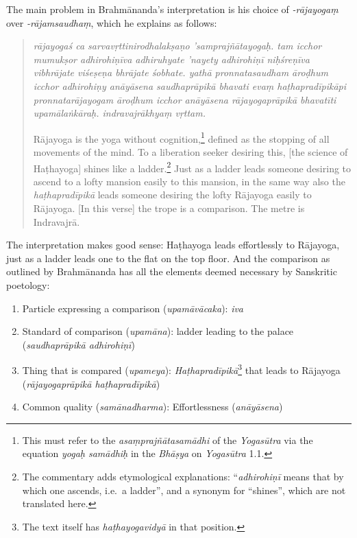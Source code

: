 \begin{ekdosis}
\begin{philcomm}[hp01_001]
The main problem in Brahmānanda's interpretation is his choice of \emph{-rājayogaṃ} over
\emph{-rājamsaudhaṃ}, which he explains as follows:

\begin{quote}
  \emph{rājayogaś ca sarvavṛttini\-rodhalakṣaṇo 'samprajñātayogaḥ. tam icchor mumukṣor adhirohiṇīva
  adhi\-ruhyate 'nayety adhirohiṇī niḥśreṇīva vibhrājate viśeṣeṇa bhrājate śobhate. yathā
  pronnatasaudham āroḍhum icchor adhirohiṇy anāyāsena saudha\-prāpi\-kā bhavati evaṃ
  haṭhapradīpikāpi pronnatarājayogam āroḍhum icchor anā\-yāsena rājayogaprāpikā bhavatīti
  upamālaṅkāraḥ.  indravajrākhyaṃ vṛttam.}

Rājayoga is the yoga without cognition,\footnote{This must refer to the \emph{asaṃprajñātasamādhi}
  of the \emph{Yogasūtra} via the equation \emph{yogaḥ samādhiḥ} in the \emph{Bhāṣya} on \emph{Yogasūtra}  1.1.} defined as the stopping of all movements of the mind. To a liberation seeker desiring this, [the science of Haṭhayoga] shines like a ladder.\footnote{The commentary adds etymological explanations: ``\emph{adhirohiṇī} means that by which one ascends, i.e.\ a ladder'', and a synonym for ``shines'', which are not translated here.} Just as a ladder leads someone desiring to ascend to a lofty mansion easily to this mansion, in the same way also the
\emph{haṭhapradīpikā} leads someone desiring the lofty Rājayoga easily to Rājayoga. [In this verse]
the trope is a comparison. The metre is Indravajrā.
\end{quote}

The interpretation makes good sense: Haṭhayoga leads effortlessly to Rājayoga, just as a ladder
leads one to the flat on the top floor. And the comparison as outlined by Brahmānanda has all the
elements deemed necessary by Sanskritic poetology:

\begin{enumerate}
\item Particle expressing a comparison (\emph{upamāvācaka}): \emph{iva} 
\item Standard of comparison (\emph{upamāna}): ladder leading to the palace (\emph{saudhaprāpikā
    adhirohiṇī}) 
\item Thing that is compared (\emph{upameya}): \emph{Haṭhapradīpikā}\footnote{The text itself has
    \emph{haṭhayogavidyā} in that position.} that leads to Rājayoga (\emph{rājayogaprāpikā
    haṭhapradīpikā}) 
\item Common quality  (\emph{samānadharma}): Effortlessness (\emph{anāyāsena})
\end{enumerate}


\end{philcomm}
\end{ekdosis}
